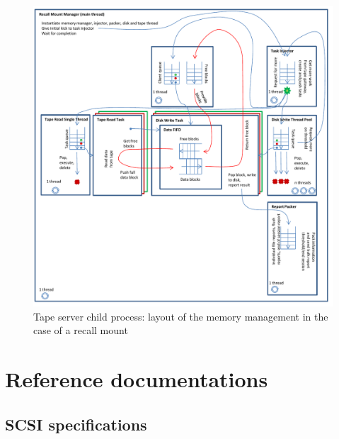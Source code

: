\begin{figure}[h]
\begin{center}
\includegraphics[scale=0.75]{images/RecallMountMM}
\end{center}
\caption{\label{tsRecallMM}Tape server child process: layout of the memory management in the case
of a recall mount}
\end{figure}



\section{Reference documentations}
\subsection{SCSI specifications}

